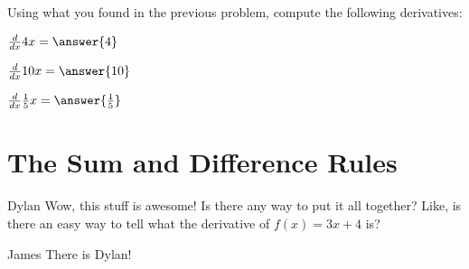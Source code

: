 \documentclass{ximera}
\begin{document}
\begin{question}
\item{Using what you found in the previous problem, compute the following derivatives:}

$\frac{d}{dx} 4x =  \answer{4}$

$\frac{d}{dx} 10x =  \answer{10}$

$\frac{d}{dx} \frac{1}{5}x =  \answer{\frac{1}{5}}$
\end{question}

\section{The Sum and Difference Rules}
\begin{dialogue}
\item[Dylan] Wow, this stuff is awesome! Is there any way to put it all together? Like, is there an easy way to tell what the derivative of $f(x) = 3x+4$ is?
\item[James] There is Dylan!
\end{dialogue}
\end{document}
